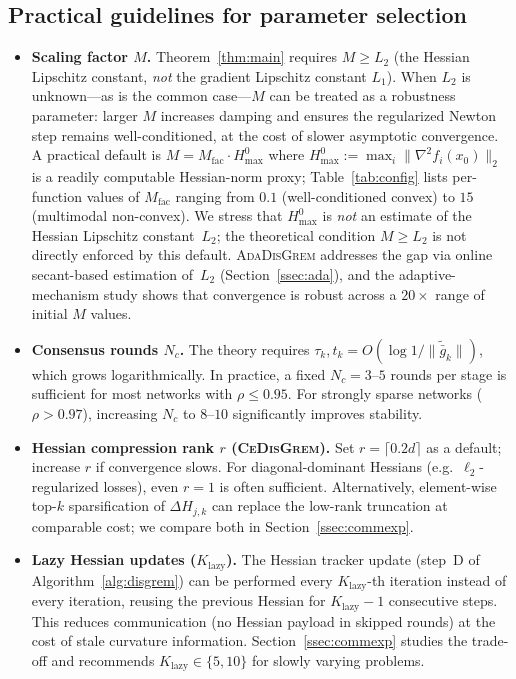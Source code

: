 \documentclass[10pt,twocolumn,letterpaper]{article}
\def\cO{O}%
\theoremstyle{compact}
\theoremstyle{compactremark}
\newcommand{\cO}{\mathcal{O}}
\begin{document}
	\subsection{Practical guidelines for parameter selection}\label{ssec:practical}
	
	\begin{itemize}[leftmargin=1.2em,itemsep=2pt]
		\item \textbf{Scaling factor $M$.}
		Theorem~\ref{thm:main} requires $M\ge L_2$
		(the Hessian Lipschitz constant, \emph{not} the gradient Lipschitz
		constant $L_1$).
		When $L_2$ is unknown---as is the common case---$M$ can be treated
		as a robustness parameter: larger $M$ increases damping and ensures the
		regularized Newton step remains well-conditioned, at the cost of
		slower asymptotic convergence.
		A practical default is $M = M_{\mathrm{fac}} \cdot H_{\max}^{0}$ where
		$H_{\max}^{0} := \max_i\|\nabla^2 f_i(x_0)\|_2$ is a readily
		computable Hessian-norm proxy;
		Table~\ref{tab:config} lists per-function values of $M_{\mathrm{fac}}$
		ranging from $0.1$ (well-conditioned convex) to $15$ (multimodal non-convex).
		We stress that $H_{\max}^{0}$ is \emph{not} an estimate of the Hessian
		Lipschitz constant~$L_2$; the theoretical condition $M\ge L_2$
		is not directly enforced by this default.
		\textsc{AdaDisGrem} addresses the gap via online secant-based
		estimation of~$L_2$ (Section~\ref{ssec:ada}), and the
		adaptive-mechanism study shows that convergence is robust
		across a $20\times$ range of initial $M$ values.
		\item \textbf{Consensus rounds $N_c$.}
		The theory requires $\tau_k, t_k = \cO(\log 1/\|\tilde{\bar g}_k\|)$, which grows
		logarithmically.  In practice, a fixed $N_c = 3$--$5$ rounds per stage is sufficient
		for most networks with $\rho \le 0.95$.
		For strongly sparse networks ($\rho > 0.97$), increasing $N_c$ to $8$--$10$
		significantly improves stability.
		\item \textbf{Hessian compression rank $r$ (\textsc{CeDisGrem}).}
		Set $r = \lceil 0.2d \rceil$ as a default; increase $r$ if convergence slows.
		For diagonal-dominant Hessians (e.g.\ $\ell_2$-regularized losses), even $r=1$
		is often sufficient.
		Alternatively, element-wise top-$k$ sparsification of $\Delta H_{j,k}$
		can replace the low-rank truncation at comparable cost; we compare both in
		Section~\ref{ssec:commexp}.
		\item \textbf{Lazy Hessian updates ($K_{\mathrm{lazy}}$).}
		The Hessian tracker update (step~D of Algorithm~\ref{alg:disgrem}) can be
		performed every $K_{\mathrm{lazy}}$-th iteration instead of every iteration,
		reusing the previous Hessian for $K_{\mathrm{lazy}}{-}1$ consecutive steps.
		This reduces communication (no Hessian payload in skipped rounds) at the cost
		of stale curvature information.
		Section~\ref{ssec:commexp} studies the trade-off and recommends
		$K_{\mathrm{lazy}}\in\{5,10\}$ for slowly varying problems.
	\end{itemize}
	
\end{document}
